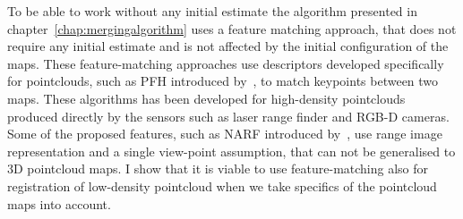 To be able to work without any initial estimate the algorithm presented in chapter~\ref{chap:mergingalgorithm} uses a feature matching approach, that does not require any initial estimate and is not affected by the initial configuration of the maps. These feature-matching approaches use descriptors developed specifically for pointclouds, such as \gls{PFH} introduced by~\citet{rusu2008pfh}, to match keypoints between two maps. These algorithms has been developed for high-density pointclouds produced directly by the sensors such as laser range finder and \gls{RGB-D} cameras. Some of the proposed features, such as \gls{NARF} introduced by~\citet{steder2010narf}, use range image representation and a single view-point assumption, that can not be generalised to \gls{3D} pointcloud maps. I show that it is viable to use feature-matching also for registration of low-density pointcloud when we take specifics of the pointcloud maps into account.
